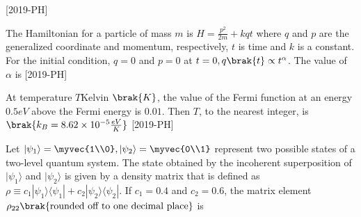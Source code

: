     \hfill{[2019-PH]}\\
\item The Hamiltonian for a particle of mass $m$ is $H=\frac{p^{2}}{2m}+kqt$ where $q$ and $p$ are the generalized coordinate and momentum, respectively, $t$ is time and $k$ is a constant. For the initial condition, $q=0$ and $p=0$ at $t=0, q\brak{t} \propto t^\alpha$. The value of $\alpha$ is \underline{\hspace{1cm}} \hfill{[2019-PH]}\\
\item At temperature $T$Kelvin $\brak{K}$, the value of the Fermi function at an energy $0.5eV$ above the Fermi energy is $0.01$. Then $T$, to the nearest integer, is \underline{\hspace{1cm}}
$\brak{k_B=8.62 \times 10^{-5} \frac{eV}{K}}$ \hfill{[2019-PH]}\\
\item Let $|\psi_1\rangle=\myvec{1\\0}, |\psi_2 \rangle=\myvec{0\\1}$ represent two possible states of a two-level quantum system. The state obtained by the incoherent superposition of $|\psi_1\rangle$ and $|\psi_2\rangle$ is given by a density matrix that is defined as $\rho \equiv c_1|\psi_1\rangle \langle\psi_1|+c_2|\psi_2\rangle \langle\psi_2|$. If $c_1=0.4$ and $c_2=0.6$, the matrix element $\rho_{22} \brak{\text{rounded off to one decimal place}}$ is \underline{\hspace{1cm}} 

